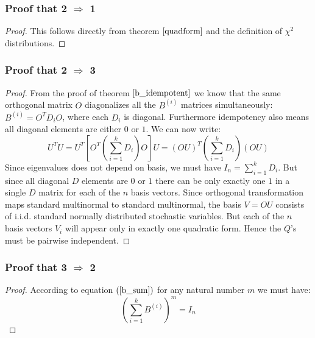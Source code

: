 \documentclass[12pt, a4paper]{article}
\begin{document}
\subsubsection{Proof that 2 $\Rightarrow$ 1}
\begin{proof}
This follows directly from theorem $\ref{quadform}$ and the definition of $\chi^2$ distributions.
\end{proof}

\subsubsection{Proof that 2 $\Rightarrow$ 3}
\begin{proof}
From the proof of theorem $\ref{b_idempotent}$ we know that the same orthogonal matrix $O$ diagonalizes all the $B^{(i)}$ matrices simultaneously: $B^{(i)}=O^T D_i O$, where each $D_i$ is diagonal. Furthermore idempotency also means all diagonal elements are either $0$ or $1$. We can now write:
\begin{equation}
U^TU=U^T\left[O^T\left(\sum_{i=1}^k D_i\right)O\right]U=(OU)^T\left(\sum_{i=1}^k D_i\right)(OU)
\end{equation}
Since eigenvalues does not depend on basis, we must have $I_n=\sum_{i=1}^k D_i$. But since all diagonal $D$ elements are $0$ or $1$ there can be only exactly one $1$ in a single $D$ matrix for each of the $n$ basis vectors. Since orthogonal transformation maps standard multinormal to standard multinormal, the basis $V=OU$ consists of i.i.d. standard normally distributed stochastic variables. But each of the $n$ basis vectors $V_i$ will appear only in exactly one quadratic form. Hence the $Q$'s must be pairwise independent.
\end{proof}

\subsubsection{Proof that 3 $\Rightarrow$ 2}
\begin{proof}
According to equation $(\ref{b_sum})$ for any natural number $m$ we must have:
\begin{equation}
\left(\sum_{i=1}^k B^{(i)}\right)^m=I_n
\end{equation}
\end{proof}
\end{document}
